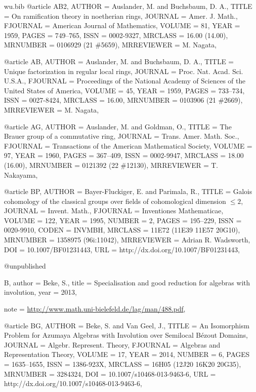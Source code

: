 \documentclass{amsart}
\numberwithin{equation}{section}
\theoremstyle{plain}
\theoremstyle{definition}
\begin{document}
\begin{filecontents}{wu.bib}
@article {AB2, 
    AUTHOR = {Auslander, M. and Buchsbaum, D. A.},
     TITLE = {On ramification theory in noetherian rings},
   JOURNAL = {Amer. J. Math.},
  FJOURNAL = {American Journal of Mathematics},
    VOLUME = {81},
      YEAR = {1959},
     PAGES = {749--765},
      ISSN = {0002-9327},
   MRCLASS = {16.00 (14.00)},
  MRNUMBER = {0106929 (21 \#5659)},
MRREVIEWER = {M. Nagata},
}

@article {AB, 
    AUTHOR = {Auslander, M. and Buchsbaum, D. A.},
     TITLE = {Unique factorization in regular local rings},
   JOURNAL = {Proc. Nat. Acad. Sci. U.S.A.},
  FJOURNAL = {Proceedings of the National Academy of Sciences of the United
              States of America},
    VOLUME = {45},
      YEAR = {1959},
     PAGES = {733--734},
      ISSN = {0027-8424},
   MRCLASS = {16.00},
  MRNUMBER = {0103906 (21 \#2669)},
MRREVIEWER = {M. Nagata},
}


@article {AG, 
    AUTHOR = {Auslander, M. and Goldman, O.},
     TITLE = {The {B}rauer group of a commutative ring},
   JOURNAL = {Trans. Amer. Math. Soc.},
  FJOURNAL = {Transactions of the American Mathematical Society},
    VOLUME = {97},
      YEAR = {1960},
     PAGES = {367--409},
      ISSN = {0002-9947},
   MRCLASS = {18.00 (16.00)},
  MRNUMBER = {0121392 (22 \#12130)},
MRREVIEWER = {T. Nakayama},
}


@article {BP, 
    AUTHOR = {Bayer-Fluckiger, E. and Parimala, R.},
     TITLE = {Galois cohomology of the classical groups over fields of
              cohomological dimension {$\le 2$}},
   JOURNAL = {Invent. Math.},
  FJOURNAL = {Inventiones Mathematicae},
    VOLUME = {122},
      YEAR = {1995},
    NUMBER = {2},
     PAGES = {195--229},
      ISSN = {0020-9910},
     CODEN = {INVMBH},
   MRCLASS = {11E72 (11E39 11E57 20G10)},
  MRNUMBER = {1358975 (96i:11042)},
MRREVIEWER = {Adrian R. Wadsworth},
       DOI = {10.1007/BF01231443},
       URL = {http://dx.doi.org/10.1007/BF01231443},
}

@unpublished{B,
	author	= {Beke, S.},
	title	= {Specialisation and good reduction for algebras with involution},
	year	= {2013},

	note	= {\url{http://www.math.uni-bielefeld.de/lag/man/488.pdf}},
}



@article {BG, 
    AUTHOR = {Beke, S. and Van Geel, J.},
     TITLE = {An {I}somorphism {P}roblem for {A}zumaya {A}lgebras with
              {I}nvolution over {S}emilocal {B}\'ezout {D}omains},
   JOURNAL = {Algebr. Represent. Theory},
  FJOURNAL = {Algebras and Representation Theory},
    VOLUME = {17},
      YEAR = {2014},
    NUMBER = {6},
     PAGES = {1635--1655},
      ISSN = {1386-923X},
   MRCLASS = {16H05 (12J20 16K20 20G35)},
  MRNUMBER = {3284324},
       DOI = {10.1007/s10468-013-9463-6},
       URL = {http://dx.doi.org/10.1007/s10468-013-9463-6},
}


\end{filecontents}
\end{document}
